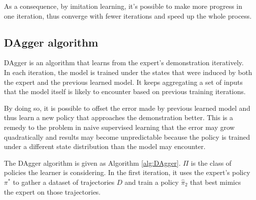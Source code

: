 \documentclass[twoside,11pt]{article}
\begin{document}
As a consequence, by imitation learning, it's possible to make more progress in one iteration, thus converge with fewer iterations and speed up the whole process.  







\subsection{DAgger algorithm}
DAgger is an algorithm that learns from the expert's demonstration iteratively. In each iteration, the model is trained under the states that were induced by both the expert and the previous learned model. It keeps aggregating a set of inputs that the model itself is likely to encounter based on previous training iterations.  

By doing so, it is possible to offset the error made by previous learned model and thus learn a new policy that approaches the demonstration better. This is a remedy to the problem in naive supervised learning that the error may grow quadratically and results may become unpredictable because the policy is trained under a different state distribution than the model may encounter. 

The DAgger algorithm is given as Algorithm \ref{alg:DAgger}.
$\Pi$ is the class of policies the learner is considering.
In the first iteration, it uses the expert's policy $\pi^*$ to gather
a dataset of trajectories $D$ and train a policy $\hat{\pi}_2$ that best mimics the expert on those trajectories. 
\end{document}
